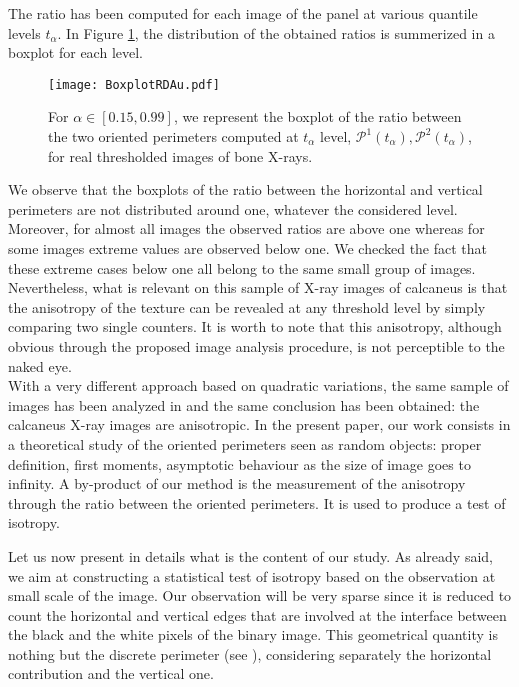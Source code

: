 \documentclass[12pt]{article}
\theoremstyle{Theorem}
\theoremstyle{definition}
\begin{document}
The ratio has been computed for each image of the panel at various quantile levels $t_{\alpha}$. In Figure \ref{figBoxplot}, the distribution of the obtained ratios is summerized in a boxplot for each level.

\begin{figure}[H]
  \centering
    {\texttt{[image: BoxplotRDAu.pdf]}}
    \hspace{0.2cm}
 \caption{For $\alpha \in [0.15, 0.99]$, we represent the boxplot of the ratio between the two oriented perimeters computed at $t_{\alpha}$ level, $\mathcal{P}^{1}(t_{\alpha}), \mathcal{P}^{2}(t_{\alpha})$, for real thresholded images of bone X-rays.}
\label{figBoxplot}
\end{figure}

We observe that the boxplots of the ratio between the horizontal and vertical perimeters are not distributed around one, whatever the considered level. 
Moreover, for almost all images the observed ratios are above one whereas for some images extreme values are observed below one. We checked the fact that these extreme cases below one all belong to the same small group of images. 
Nevertheless, what is relevant on this sample of X-ray images of calcaneus is that the anisotropy of the texture can be revealed at any threshold level by simply comparing two single counters. It is worth to note that this anisotropy, although obvious through the proposed image analysis procedure, is not perceptible to the naked eye. \\
With a very different approach based on quadratic variations, the same sample of images has been analyzed in \cite{Richard-Birme} and the same conclusion has been obtained: the calcaneus X-ray images are anisotropic. In the present paper, our work consists in a theoretical study of the oriented perimeters seen as random objects: proper definition, first moments, asymptotic behaviour as the size of image goes to infinity. A by-product of our method is the measurement of the anisotropy through the ratio between the oriented perimeters. It is used to produce a test of isotropy.

\bigskip

Let us now present in details what is the content of our study. As already said, we aim at constructing a statistical test of isotropy based on the observation at small scale of the image. Our observation will be very sparse since it is reduced to count the horizontal and vertical edges that are involved at the interface between the black and the white pixels of the binary image. This geometrical quantity is nothing but the discrete perimeter (see \cite{HermineAgnes}), considering separately the horizontal contribution and the vertical one. 
\end{document}

